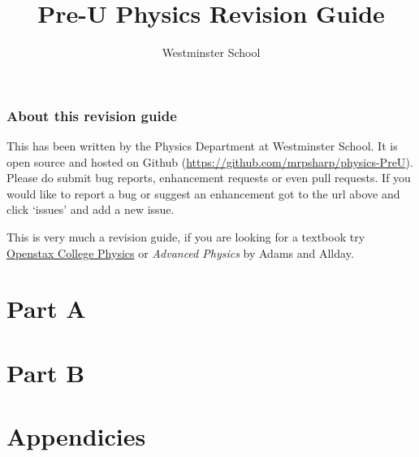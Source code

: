 \documentclass[a4paper,11pt,twoside]{memoir}
\title{Pre-U Physics Revision Guide}
\author{Westminster School}
\newcounter{spec}[chapter]
\begin{document}
\raggedbottom
\frontmatter
\begin{titlingpage}
	\maketitle
		\thispagestyle{empty}
	\clearpage
	\section*{About this revision guide}
	This has been written by the Physics Department at Westminster School. It is open source and hosted on Github (\url{https://github.com/mrpsharp/physics-PreU}). Please do submit bug reports, enhancement requests or even pull requests. If you would like to report a bug or suggest an enhancement got to the url above and click `issues' and add a new issue.

	This is very much a revision guide, if you are looking for a textbook try \href{https://openstax.org/details/books/college-physics}{Openstax College Physics} or \emph{Advanced Physics} by Adams and Allday.
\end{titlingpage}

\tableofcontents


\mainmatter
\part*{Part A}









\part*{Part B}











\appendix
\part*{Appendicies}



\backmatter
\end{document}
